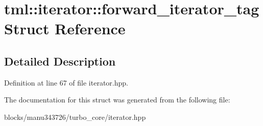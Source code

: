 \hypertarget{structtml_1_1iterator_1_1forward__iterator__tag}{\section{tml\+:\+:iterator\+:\+:forward\+\_\+iterator\+\_\+tag Struct Reference}
\label{structtml_1_1iterator_1_1forward__iterator__tag}
}


\subsection{Detailed Description}


Definition at line 67 of file iterator.\+hpp.



The documentation for this struct was generated from the following file\+:\begin{DoxyCompactItemize}
\item 
blocks/manu343726/turbo\+\_\+core/iterator.\+hpp\end{DoxyCompactItemize}
